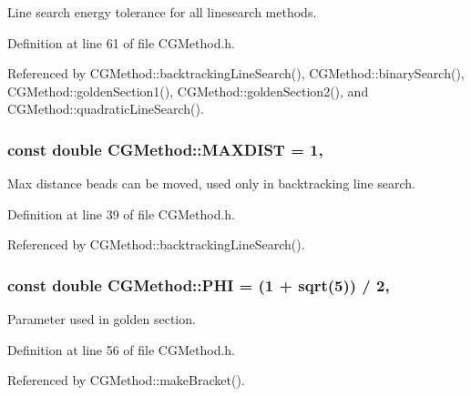 Line search energy tolerance for all linesearch methods. 



Definition at line 61 of file C\+G\+Method.\+h.



Referenced by C\+G\+Method\+::backtracking\+Line\+Search(), C\+G\+Method\+::binary\+Search(), C\+G\+Method\+::golden\+Section1(), C\+G\+Method\+::golden\+Section2(), and C\+G\+Method\+::quadratic\+Line\+Search().

\hypertarget{classCGMethod_a814ea57c3493f31f4ffd1cfa71795871}{
\subsubsection[{M\+A\+X\+D\+I\+S\+T}]{\setlength{\rightskip}{0pt plus 5cm}const double C\+G\+Method\+::\+M\+A\+X\+D\+I\+S\+T = 1\hspace{0.3cm}{\ttfamily [protected]}, {\ttfamily [inherited]}}}\label{classCGMethod_a814ea57c3493f31f4ffd1cfa71795871}


Max distance beads can be moved, used only in backtracking line search. 



Definition at line 39 of file C\+G\+Method.\+h.



Referenced by C\+G\+Method\+::backtracking\+Line\+Search().

\hypertarget{classCGMethod_ab6ca0706dec56fe6e35f15f9791b3e23}{
\subsubsection[{P\+H\+I}]{\setlength{\rightskip}{0pt plus 5cm}const double C\+G\+Method\+::\+P\+H\+I = (1 + sqrt(5)) / 2\hspace{0.3cm}{\ttfamily [protected]}, {\ttfamily [inherited]}}}\label{classCGMethod_ab6ca0706dec56fe6e35f15f9791b3e23}


Parameter used in golden section. 



Definition at line 56 of file C\+G\+Method.\+h.



Referenced by C\+G\+Method\+::make\+Bracket().

